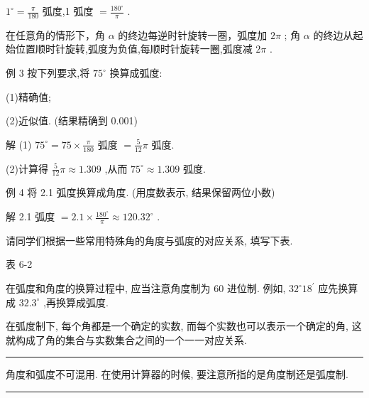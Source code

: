 \documentclass[10pt]{article}
\newcommand{\HRule}{\begin{center}\rule{0.9\linewidth}{0.2mm}\end{center}}
\begin{document}
\({1}^{ \circ  } = \frac{\pi }{180}\) 弧度,1 弧度 \(= \frac{{180}^{ \circ  }}{\pi }\) .

在任意角的情形下，角 \(\alpha\) 的终边每逆时针旋转一圈，弧度加 \({2\pi }\) ; 角 \(\alpha\) 的终边从起始位置顺时针旋转,弧度为负值,每顺时针旋转一圈,弧度减 \({2\pi }\) .

例 3 按下列要求,将 \({75}^{ \circ  }\) 换算成弧度:

(1)精确值;

(2)近似值. (结果精确到 0.001)

解 (1) \({75}^{ \circ  } = {75} \times  \frac{\pi }{180}\) 弧度 \(= \frac{5}{12}\pi\) 弧度.

(2)计算得 \(\frac{5}{12}\pi  \approx  {1.309}\) ,从而 \({75}^{ \circ  } \approx  {1.309}\) 弧度.

例 4 将 2.1 弧度换算成角度. (用度数表示, 结果保留两位小数)

解 2.1 弧度 \(= {2.1} \times  \frac{{180}^{ \circ  }}{\pi } \approx  {120.32}^{ \circ  }\) .

请同学们根据一些常用特殊角的角度与弧度的对应关系, 填写下表.

表 6-2

\begin{center}
\end{center}

在弧度和角度的换算过程中, 应当注意角度制为 60 进位制. 例如, \({32}^{ \circ  }{18}^{\prime }\) 应先换算成 \({32.3}^{ \circ  }\) ,再换算成弧度.

在弧度制下, 每个角都是一个确定的实数, 而每个实数也可以表示一个确定的角, 这就构成了角的集合与实数集合之间的一个一一对应关系.

\HRule

角度和弧度不可混用. 在使用计算器的时候, 要注意所指的是角度制还是弧度制.

\HRule
\end{document}
